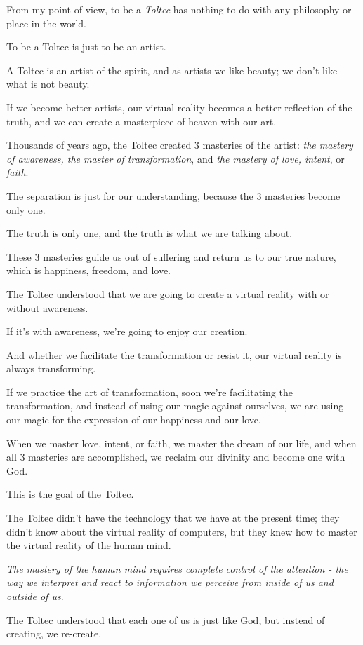 \documentclass{article}
\numberwithin{equation}{section}
\begin{document}
From my point of view, to be a \textit{Toltec} has nothing to do with any philosophy or place in the world.

To be a Toltec is just to be an artist.

A Toltec is an artist of the spirit, and as artists we like beauty; we don't like what is not beauty.

If we become better artists, our virtual reality becomes a better reflection of the truth, and we can create a masterpiece of heaven with our art.

%
Thousands of years ago, the Toltec created 3 masteries of the artist: \textit{the mastery of awareness, the master of transformation}, and \textit{the mastery of love, intent}, or \textit{faith}.

The separation is just for our understanding, because the 3 masteries become only one.

The truth is only one, and the truth is what we are talking about.

These 3 masteries guide us out of suffering and return us to our true nature, which is happiness, freedom, and love.

%
The Toltec understood that we are going to create a virtual reality with or without awareness.

If it's with awareness, we're going to enjoy our creation.

And whether we facilitate the transformation or resist it, our virtual reality is always transforming.

If we practice the art of transformation, soon we're facilitating the transformation, and instead of using our magic against ourselves, we are using our magic for the expression of our happiness and our love.

When we master love, intent, or faith, we master the dream of our life, and when all 3 masteries are accomplished, we reclaim our divinity and become one with God.

This is the goal of the Toltec.

%
The Toltec didn't have the technology that we have at the present time; they didn't know about the virtual reality of computers, but they knew how to master the virtual reality of the human mind.

\textit{The mastery of the human mind requires complete control of the attention - the way we interpret and react to information we perceive from inside of us and outside of us}.

The Toltec understood that each one of us is just like God, but instead of creating, we re-create.
\end{document}
